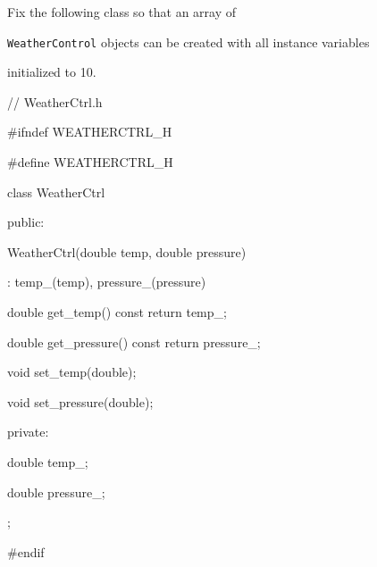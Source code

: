 Fix the following class so that an array of

\texttt{WeatherControl} objects can be created with all instance variables

initialized to 10.

\begin{console}

// WeatherCtrl.h

#ifndef WEATHERCTRL_H

#define WEATHERCTRL_H



class WeatherCtrl

{

public:

        WeatherCtrl(double temp, double pressure)

        : temp_(temp), pressure_(pressure)

        {}

        double get_temp() const { return temp_; }

        double get_pressure() const { return pressure_; }

        void set_temp(double);

        void set_pressure(double);

private:

        double temp_;

        double pressure_;

};



#endif

\end{console}

